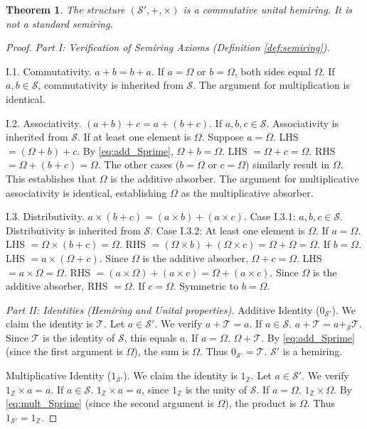 \documentclass[11pt, a4paper]{article}
\theoremstyle{plain}
\newtheorem{theorem}{Theorem}[section]
\theoremstyle{definition}
\numberwithin{equation}{section}
\newcommand{\Z}{\mathbb{Z}}
\newcommand{\Tobj}{\mathcal{T}} %
\newcommand{\OmegaObj}{\Omega} %
\newcommand{\SemiringS}{\mathcal{S}}
\newcommand{\SemiringSPrime}{\mathcal{S}'}
\begin{document}
\begin{theorem}\label{thm:SPrime_is_semiring}
The structure $(\SemiringSPrime, +, \times)$ is a commutative unital hemiring. It is not a standard semiring.
\end{theorem}
\begin{proof}
\emph{Part I: Verification of Semiring Axioms (Definition \ref{def:semiring}).}

I.1. Commutativity. $a+b=b+a$. If $a=\OmegaObj$ or $b=\OmegaObj$, both sides equal $\OmegaObj$. If $a, b \in \SemiringS$, commutativity is inherited from $\SemiringS$. The argument for multiplication is identical.

I.2. Associativity. $(a+b)+c = a+(b+c)$.
If $a, b, c \in \SemiringS$. Associativity is inherited from $\SemiringS$.
If at least one element is $\OmegaObj$. Suppose $a=\OmegaObj$. LHS $= (\OmegaObj+b)+c$. By \eqref{eq:add_Sprime}, $\OmegaObj+b=\OmegaObj$. LHS $=\OmegaObj+c = \OmegaObj$. RHS $= \OmegaObj+(b+c) = \OmegaObj$.
The other cases ($b=\OmegaObj$ or $c=\OmegaObj$) similarly result in $\OmegaObj$. This establishes that $\OmegaObj$ is the additive absorber.
The argument for multiplicative associativity is identical, establishing $\OmegaObj$ as the multiplicative absorber.

I.3. Distributivity. $a\times(b+c) = (a\times b) + (a\times c)$.
Case I.3.1: $a, b, c \in \SemiringS$. Distributivity is inherited from $\SemiringS$.
Case I.3.2: At least one element is $\OmegaObj$.
If $a=\OmegaObj$. LHS $=\OmegaObj\times(b+c) = \OmegaObj$. RHS $= (\OmegaObj\times b) + (\OmegaObj\times c) = \OmegaObj+\OmegaObj = \OmegaObj$.
If $b=\OmegaObj$. LHS $= a\times(\OmegaObj+c)$. Since $\OmegaObj$ is the additive absorber, $\OmegaObj+c=\OmegaObj$. LHS $= a\times\OmegaObj = \OmegaObj$.
RHS $= (a\times\OmegaObj) + (a\times c) = \OmegaObj+(a\times c)$. Since $\OmegaObj$ is the additive absorber, RHS $=\OmegaObj$.
If $c=\OmegaObj$. Symmetric to $b=\OmegaObj$.

\emph{Part II: Identities (Hemiring and Unital properties).}
Additive Identity ($0_{\SemiringSPrime}$). We claim the identity is $\Tobj$.
Let $a \in \SemiringSPrime$. We verify $a+\Tobj=a$.
If $a \in \SemiringS$. $a+\Tobj = a+_{\SemiringS}\Tobj$. Since $\Tobj$ is the identity of $\SemiringS$, this equals $a$.
If $a=\OmegaObj$. $\OmegaObj+\Tobj$. By \eqref{eq:add_Sprime} (since the first argument is $\OmegaObj$), the sum is $\OmegaObj$.
Thus $0_{\SemiringSPrime}=\Tobj$. $\SemiringSPrime$ is a hemiring.

Multiplicative Identity ($1_{\SemiringSPrime}$). We claim the identity is $1_{\Z}$.
Let $a \in \SemiringSPrime$. We verify $1_{\Z}\times a=a$.
If $a \in \SemiringS$. $1_{\Z}\times a = a$, since $1_{\Z}$ is the unity of $\SemiringS$.
If $a=\OmegaObj$. $1_{\Z}\times\OmegaObj$. By \eqref{eq:mult_Sprime} (since the second argument is $\OmegaObj$), the product is $\OmegaObj$.
Thus $1_{\SemiringSPrime}=1_{\Z}$.


\end{proof}
\end{document}
